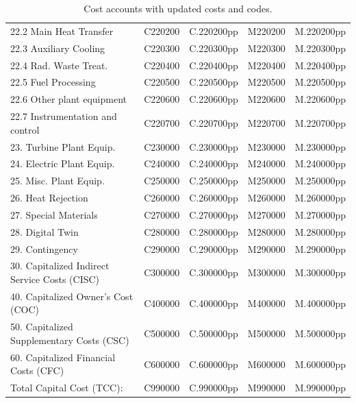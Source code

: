 \begin{table}[h!]
{\begin{tabular}{lcccc}
\hspace{10mm}22.2 Main Heat Transfer & C220200 & C.220200pp & M220200 & M.220200pp \\
\hspace{10mm}22.3 Auxiliary Cooling & C220300 & C.220300pp & M220300 & M.220300pp \\
\hspace{10mm}22.4 Rad. Waste Treat. & C220400 & C.220400pp & M220400 & M.220400pp \\
\hspace{10mm}22.5 Fuel Processing & C220500 & C.220500pp & M220500 & M.220500pp \\
\hspace{10mm}22.6 Other plant equipment & C220600 & C.220600pp & M220600 & M.220600pp \\
\hspace{10mm}22.7 Instrumentation and control & C220700 & C.220700pp & M220700 & M.220700pp \\
\hspace{5mm}23. Turbine Plant Equip. & C230000 & C.230000pp & M230000 & M.230000pp \\
\hspace{5mm}24. Electric Plant Equip. & C240000 & C.240000pp & M240000 & M.240000pp \\
\hspace{5mm}25. Misc. Plant Equip. & C250000 & C.250000pp & M250000 & M.250000pp \\
\hspace{5mm}26. Heat Rejection & C260000 & C.260000pp & M260000 & M.260000pp \\
\hspace{5mm}27. Special Materials & C270000 & C.270000pp & M270000 & M.270000pp \\
\hspace{5mm}28. Digital Twin & C280000 & C.280000pp & M280000 & M.280000pp \\
\hspace{5mm}29. Contingency & C290000 & C.290000pp & M290000 & M.290000pp \\
30. Capitalized Indirect Service Costs (CISC) & C300000 & C.300000pp & M300000 & M.300000pp \\
40. Capitalized Owner's Cost (COC) & C400000 & C.400000pp & M400000 & M.400000pp \\
50. Capitalized Supplementary Costs (CSC) & C500000 & C.500000pp & M500000 & M.500000pp \\
60. Capitalized Financial Costs (CFC) & C600000 & C.600000pp & M600000 & M.600000pp \\
\hline
Total Capital Cost (TCC): & C990000 & C.990000pp & M990000 & M.990000pp \\
\hline
\end{tabular}
}
\caption{Cost accounts with updated costs and codes. }
\label{tab:costsupdatedcodes}
\end{table}


